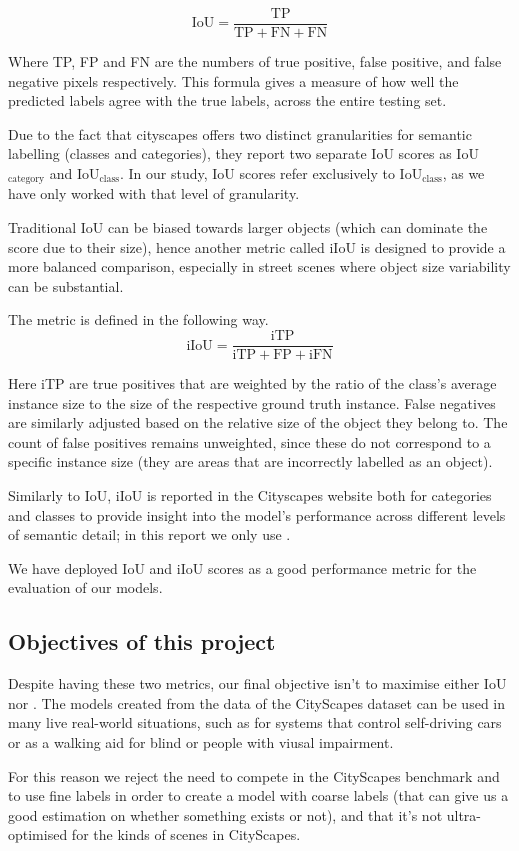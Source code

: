\begin{equation*}
	\text{IoU} = \frac{\text{TP}}{\text{TP} + \text{FN} + \text{FN}}
\end{equation*}

Where TP, FP and FN are the numbers of true positive, false positive, and false negative pixels respectively.
This formula gives a measure of how well the predicted labels agree with the true labels, across the entire testing set.

Due to the fact that cityscapes offers two distinct granularities for semantic labelling (classes and categories), they report two separate IoU scores as IoU$_\text{category}$ and IoU$_\text{class}$. In our study, IoU scores refer exclusively to IoU$_\text{class}$, as we have only worked with that level of granularity.

Traditional IoU can be biased towards larger objects (which can dominate the score due to their size), hence another metric called iIoU is designed to provide a more balanced comparison, especially in street scenes where object size variability can be substantial.

The metric is defined in the following way.
\begin{equation*}
	\text{iIoU} = \frac{\text{iTP}}{\text{iTP} + \text{FP} + \text{iFN}}	
\end{equation*}

Here iTP are true positives that are weighted by the ratio of the class's average instance size to the size of the respective ground truth instance. False negatives are similarly adjusted based on the relative size of the object they belong to. The count of false positives remains unweighted, since these do not correspond to a specific instance size (they are areas that are incorrectly labelled as an object).

Similarly to IoU, iIoU is reported in the Cityscapes website both for categories and classes to provide insight into the model's performance across different levels of semantic detail; in this report we only use \iiouc{}.

We have deployed IoU and iIoU scores as a good performance metric for the evaluation of our models. 

\subsection{Objectives of this project}

Despite having these two metrics, our final objective isn't to maximise either IoU nor \iiouc{}.
The models created from the data of the CityScapes dataset can be used in many live real-world situations, such as for systems that control self-driving cars or as a walking aid for blind or people with viusal impairment.

For this reason we reject the need to compete in the CityScapes benchmark\cite{cityscapes_benchmark} and to use fine labels in order to create a model with coarse labels (that can give us a good estimation on whether something exists or not), and that it's not ultra-optimised for the kinds of scenes in CityScapes.
